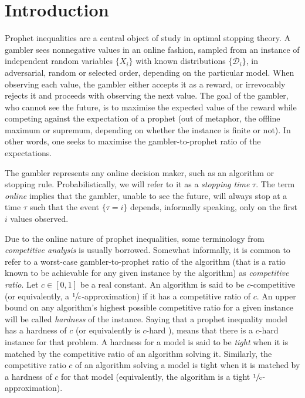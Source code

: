\documentclass[11pt, a4paper, twoside]{article}
\numberwithin{equation}{section}
\begin{document}
	\section{Introduction}
	Prophet inequalities are a central object of study in optimal stopping theory. A gambler sees nonnegative values in an online fashion, sampled from an instance of independent random variables $\{X_i\}$ with known distributions $\{\mathcal{D}_i\}$, in adversarial, random or selected order, depending on the particular model. When observing each value, the gambler either accepts it as a reward, or irrevocably rejects it and proceeds with observing the next value. The goal of the gambler, who cannot see the future, is to maximise the expected value of the reward while competing against the expectation of a prophet (out of metaphor, the offline maximum or supremum, depending on whether the instance is finite or not). In other words, one seeks to maximise the gambler-to-prophet ratio of the expectations.
	
	The gambler represents any online decision maker, such as an algorithm or stopping rule. Probabilistically, we will refer to it as a \textit{stopping time} $\tau$. The term \textit{online} implies that the gambler, unable to see the future, will always stop at a time $\tau$ such that the event $\{\tau=i\}$ depends, informally speaking, only on the first $i$ values observed.

	Due to the online nature of prophet inequalities, some terminology from \textit{competitive analysis} is usually borrowed. Somewhat informally, it is common to refer to a worst-case gambler-to-prophet ratio of the algorithm (that is a ratio known to be achievable for any given instance by the algorithm) as \textit{competitive ratio}. Let $c\in[0,1]$ be a real constant. An algorithm is said to be $c$-competitive (or equivalently, a $\sfrac{1}{c}$-approximation) if it has a competitive ratio of $c$. An upper bound on any algorithm's highest possible competitive ratio for a given instance will be called \textit{hardness} of the instance. Saying that a prophet inequality model has a hardness of $c$ (or equivalently is $c$-hard ), means that there is a $c$-hard instance for that problem. A hardness for a model is said to be \textit{tight} when it is matched by the competitive ratio of an algorithm solving it. Similarly, the competitive ratio $c$ of an algorithm solving a model is tight when it is matched by a hardness of $c$ for that model (equivalently, the algorithm is a tight $\sfrac{1}{c}$-approximation).
	
\end{document}
